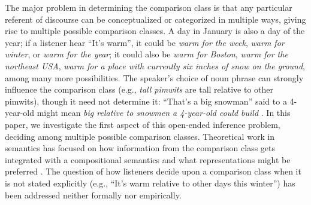 \documentclass[doc]{apa6}
\begin{document}
The major problem in determining the comparison class is that any particular referent of discourse can be conceptualized or categorized in
multiple ways, giving rise to multiple possible comparison classes. A day in
January is also a day of the year; if a listener hear ``It's
warm'', it could be \emph{warm for the week}, \emph{warm for winter}, or
\emph{warm for the year}; it could also be \emph{warm for
  Boston}, \emph{warm for the northeast USA}, \emph{warm for a place
  with currently six inches of snow on the ground}, among many more
  possibilities.
The speaker's choice of noun phrase can strongly influence the comparison class  (e.g., \emph{tall pimwits} are tall relative to other pimwits), though it need not determine it: ``That's a big snowman'' said to a 4-year-old might mean \emph{big relative to snowmen a 4-year-old could build} \cite{kamp1975two}.  
 In this paper, we investigate the first aspect of
this open-ended inference problem, deciding among multiple possible comparison
classes. Theoretical work in semantics has focused on how information
from the comparison class gets integrated with a compositional semantics
and what representations might be preferred \cite{Bale2011, Solt2009}.
The question of how listeners decide upon a comparison class when it is not stated explicitly (e.g., ``It's warm relative to other days this winter'') has been addressed neither formally nor empirically.
\end{document}
